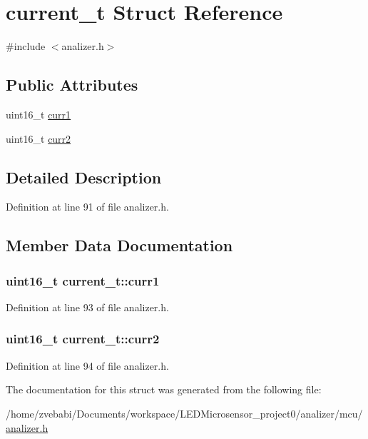 \hypertarget{structcurrent__t}{\section{current\+\_\+t Struct Reference}
\label{structcurrent__t}
}


{\ttfamily \#include $<$analizer.\+h$>$}

\subsection*{Public Attributes}
\begin{DoxyCompactItemize}
\item 
uint16\+\_\+t \hyperlink{structcurrent__t_a67184c6cc4a6cc7d301880214965518b}{curr1}
\item 
uint16\+\_\+t \hyperlink{structcurrent__t_aa9880547f852fd6b213265f267da44c8}{curr2}
\end{DoxyCompactItemize}


\subsection{Detailed Description}


Definition at line 91 of file analizer.\+h.



\subsection{Member Data Documentation}
\hypertarget{structcurrent__t_a67184c6cc4a6cc7d301880214965518b}{
\subsubsection[{curr1}]{\setlength{\rightskip}{0pt plus 5cm}uint16\+\_\+t current\+\_\+t\+::curr1}}\label{structcurrent__t_a67184c6cc4a6cc7d301880214965518b}


Definition at line 93 of file analizer.\+h.

\hypertarget{structcurrent__t_aa9880547f852fd6b213265f267da44c8}{
\subsubsection[{curr2}]{\setlength{\rightskip}{0pt plus 5cm}uint16\+\_\+t current\+\_\+t\+::curr2}}\label{structcurrent__t_aa9880547f852fd6b213265f267da44c8}


Definition at line 94 of file analizer.\+h.



The documentation for this struct was generated from the following file\+:\begin{DoxyCompactItemize}
\item 
/home/zvebabi/\+Documents/workspace/\+L\+E\+D\+Microsensor\+\_\+project0/analizer/mcu/\hyperlink{analizer_8h}{analizer.\+h}\end{DoxyCompactItemize}
